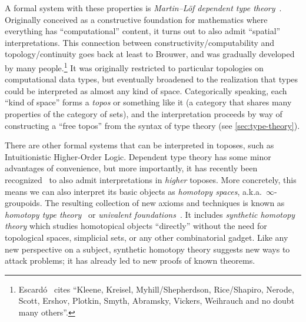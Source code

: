 \documentclass[12pt]{article}
\def\oo{\ensuremath{\infty}}
\numberwithin{equation}{section}
\begin{document}
A formal system with these properties is \emph{Martin--L\"{o}f dependent type theory}~\cite{martinlof:itt-pred,martinlof:itt}.
Originally conceived as a constructive foundation for mathematics where everything has ``computational'' content, it turns out to also admit ``spatial'' interpretations. %
This connection between constructivity/computability and topology/continuity goes back at least to Brouwer, and was gradually developed by many people.\footnote{Escard\'o~\cite{escardo:syntop-datatypes} cites ``Kleene, Kreisel, Myhill/Shepherdson, Rice/Shapiro, Nerode, Scott, Ershov, Plotkin, Smyth, Abramsky, Vickers, Weihrauch and no doubt many others''.}
It was originally restricted to particular topologies on computational data types, but eventually broadened to the realization that types could be interpreted as almost any kind of space. %
Categorically speaking, each ``kind of space'' forms a \emph{topos} or something like it (a category that shares many properties of the category of sets), and the interpretation proceeds by way of constructing a ``free topos'' from the syntax of type theory (see \cref{sec:type-theory}).

There are other formal systems that can be interpreted in toposes, such as Intuitionistic Higher-Order Logic.
Dependent type theory has some minor advantages of convenience, but more importantly, it has recently been recognized~\cite{aw:htpy-idtype,klv:ssetmodel} to also admit interpretations in \emph{higher} toposes.
More concretely, this means we can also interpret its basic objects as \emph{homotopy spaces}, a.k.a.\ \oo-groupoids.
The resulting collection of new axioms and techniques is known as \emph{homotopy type theory}~\cite{hottbook} or \emph{univalent foundations}~\cite{vv:unimath}.
It includes \emph{synthetic homotopy theory} which studies homotopical objects ``directly'' without the need for topological spaces, simplicial sets, or any other combinatorial gadget.
Like any new perspective on a subject, synthetic homotopy theory suggests new ways to attack problems; it has already led to new proofs of known theorems.
\end{document}
